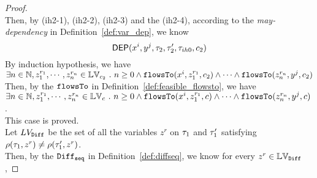 \begin{proof}
\\
Then, by (ih2-1), (ih2-2), (ih2-3) and the (ih2-4), 
according to the \emph{may-dependency} in Definition~\ref{def:var_dep}, we know
\[
  \mathsf{DEP}(x^i, y^j, \mathtt{\tau}_2, \mathtt{\tau}_2', \mathtt{\tau}_{ih0}, c_2)
\] 
%
By induction hypothesis, we have 
\\
$\exists n \in \mathbb{N}, z_1^{r_1}, \cdots, z_n^{r_n} \in \mathbb{LV}_{{c_2}} ~.~ n \geq 0 \land
\mathtt{flowsTo}(x^i,  z_1^{r_1}, c_2) 
\land \cdots \land \mathtt{flowsTo}(z_n^{r_n}, y^j, c_2)$
\\
Then, by the $\mathtt{flowsTo}$ in Definition~\ref{def:feasible_flowsto}, we have 
\\
$\exists n \in \mathbb{N}, z_1^{r_1}, \cdots, z_n^{r_n} \in \mathbb{LV}_{{c}} ~.~ n \geq 0 \land
\mathtt{flowsTo}(x^i,  z_1^{r_1}, c) 
\land \cdots \land \mathtt{flowsTo}(z_n^{r_n}, y^j, c)$.
\\
This case is proved.
%
\\
Let $LV_{\mathtt{Diff}}$ be the set of all the variables $z^r$ on $\mathtt{\tau}_1$ and $\mathtt{\tau}_1'$ 
satisfying $\rho(\mathtt{\tau}_1, z^r) \neq \rho(\mathtt{\tau}_1', z^r) $.
\\
Then, by the $\mathtt{Diff}_{\mathtt{seq}}$ in Definition~\ref{def:diffseq}, we know for every $z^r \in \mathbb{LV}_{\mathtt{Diff}}$,

\end{proof}
